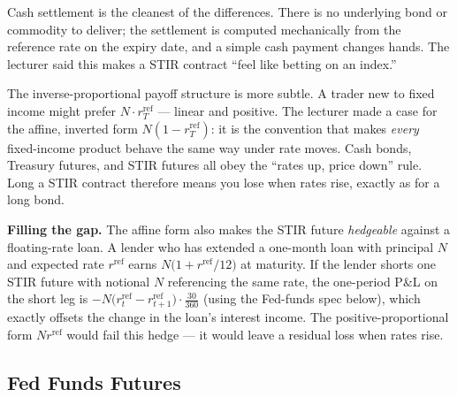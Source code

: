 Cash settlement is the cleanest of the differences. There is no underlying
bond or commodity to deliver; the settlement is computed mechanically from
the reference rate on the expiry date, and a simple cash payment changes
hands. The lecturer said this makes a STIR contract ``feel like betting on
an index.''

The inverse-proportional payoff structure is more subtle. A trader new to
fixed income might prefer $N \cdot r^{\text{ref}}_T$ --- linear and
positive. The lecturer made a case for the affine, inverted form
$N(1-r^{\text{ref}}_T)$: it is the convention that makes
\emph{every} fixed-income product behave the same way under rate moves.
Cash bonds, Treasury futures, and STIR futures all obey the
``rates up, price down'' rule. Long a STIR contract therefore means you
lose when rates rise, exactly as for a long bond.

\begin{tipblock}
\textbf{Filling the gap.} The affine form also makes the STIR future
\emph{hedgeable} against a floating-rate loan. A lender who has extended
a one-month loan with principal $N$ and expected rate $r^{\text{ref}}$
earns $N\bigl(1 + r^{\text{ref}}/12\bigr)$ at maturity. If the lender
shorts one STIR future with notional $N$ referencing the same rate, the
one-period P\&L on the short leg is $-N\bigl(r^{\text{ref}}_{t} - r^{\text{ref}}_{t+1}\bigr) \cdot \tfrac{30}{360}$
(using the Fed-funds spec below), which exactly offsets the change in the
loan's interest income. The positive-proportional form $N r^{\text{ref}}$
would fail this hedge --- it would leave a residual loss when rates rise.
\end{tipblock}

\subsection{Fed Funds Futures}\label{L3-sec:stir-fff}

